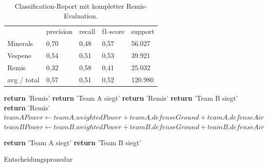 \begin{table}
\centering
\caption{Classification-Report mit kompletter Remis-Evaluation.}
\begin{tabular}{@{}lllll@{}}
\hline
& precision & recall & f1-score & support\\
Minerals & 0,70 & 0,48 & 0,57 & 56.027\\
Vespene & 0,54 & 0,51 & 0,53 & 39.921\\
Remis & 0,32 & 0,58 & 0,41 & 25.032\\
 avg / total & 0,57 & 0,51 & 0,52 & 120.980\\
\hline
\end{tabular}
\label{tb:classificationcomplete}
\end{table}

\begin{algorithm}
\begin{algorithmic}[1]
	\State \textbf{return} 'Remis' 
\EndIf
{}
		\State \textbf{return} 'Team A siegt'
	\Else 
		\State \textbf{return} 'Remis'
	\EndIf
\EndIf
{}
	\State \textbf{return} 'Team B siegt'
\Else 
	\State \textbf{return} 'Remis' 
\EndIf
\EndIf
\State $teamAPower \leftarrow teamA.weightedPower + teamA.defenseGround + teamA.defenseAir$
\State $teamBPower \leftarrow teamB.weightedPower + teamB.defenseGround + teamB.defenseAir$

	\State \textbf{return} 'Team A siegt'
\Else
	\State \textbf{return} 'Team B siegt'
\EndIf
\EndProcedure
\end{algorithmic}
\caption{Entscheidungsprozedur}
\label{alg:decider}
\end{algorithm}

